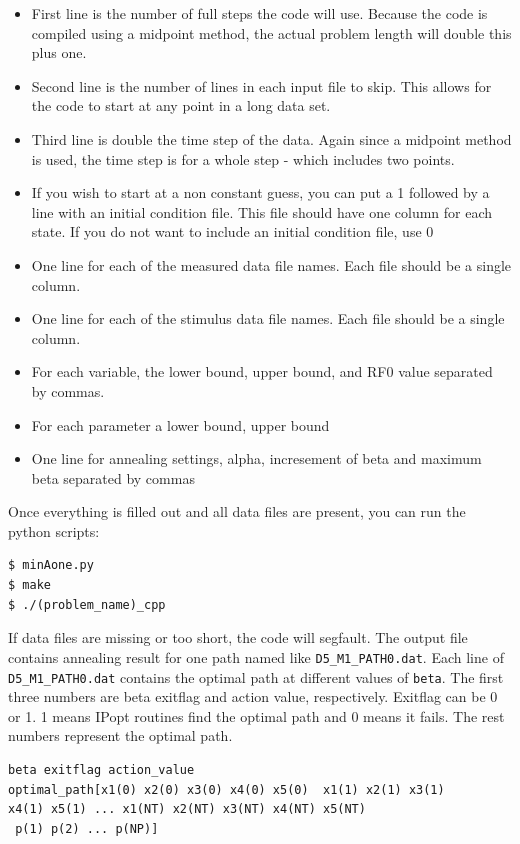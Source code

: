 \documentclass[11pt]{article}
\begin{document}
\begin{itemize}
\item First line is the number of full steps the code will use.  Because the code is compiled using a midpoint method, the actual problem length will double this plus one.
\item Second line is the number of lines in each input file to skip.  This allows for the code to start at any point in a long data set.
\item Third line is double the time step of the data.  Again since a midpoint method is used, the time step is for a whole step - which includes two points.
\item If you wish to start at a non constant guess, you can put a 1 followed by a line with an initial condition file.  This file should have one column for each state.  If you do not want to include an initial condition file, use 0
\item One line for each of the measured data file names.  Each file should be a single column.
\item One line for each of the stimulus data file names.  Each file should be a single column.
\item For each variable, the lower bound, upper bound, and RF0 value separated by commas.
\item For each parameter a lower bound, upper bound
\item One line for annealing settings, alpha, incresement of beta and maximum beta separated by commas
\end{itemize}
Once everything is filled out and all data files are present, you can run the python scripts:
\begin{verbatim}
$ minAone.py
$ make
$ ./(problem_name)_cpp
\end{verbatim}
If data files are missing or too short, the code will segfault.  The output file contains annealing result for one path named like \texttt{D5\_M1\_PATH0.dat}.  Each line of  \texttt{D5\_M1\_PATH0.dat} contains the optimal path at different values of \texttt{beta}. The first three numbers are beta exitflag and action value, respectively. Exitflag can be 0 or 1. 1 means IPopt routines find the optimal path and 0 means it fails. The rest numbers represent the optimal path.
\begin{verbatim}
beta exitflag action_value 
optimal_path[x1(0) x2(0) x3(0) x4(0) x5(0)  x1(1) x2(1) x3(1) 
x4(1) x5(1) ... x1(NT) x2(NT) x3(NT) x4(NT) x5(NT)
 p(1) p(2) ... p(NP)]
\end{verbatim}
\end{document}
